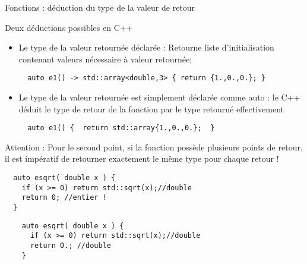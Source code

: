 \documentclass[compress,10pt,aspectratio=169]{beamer}
\begin{document}
\begin{frame}[fragile]{Fonctions : déduction du type de la valeur de retour}
    \scriptsize
    
    Deux déductions possibles en C++
    \begin{itemize}
  \item \textcolor{NavyBlue}{Le type de la valeur retournée déclarée} : Retourne liste d'initialisation contenant valeurs nécessaire à valeur retournée;
  \begin{verbatim}
  auto e1() -> std::array<double,3> { return {1.,0.,0.}; }
  \end{verbatim}
  \item \textcolor{NavyBlue}{Le type de la valeur retournée est simplement déclarée comme auto} : le C++ déduit le type de retour de la fonction par le type retourné
  effectivement
  \begin{verbatim}
  auto e1() {  return std::array{1.,0.,0.};  }
  \end{verbatim}
  \end{itemize}
  
  \alert{Attention} : Pour le second point, si la fonction possède plusieurs points de retour, il est impératif de retourner exactement
  le même type pour chaque retour !
  
  \begin{multicols}{2}
  \begin{tcolorbox}[colback=red!5!white,colframe=red!30!black, title={\scriptsize Ne compile pas !}]
  \begin{verbatim}
  auto esqrt( double x ) {
    if (x >= 0) return std::sqrt(x);//double
    return 0; //entier !
  }
  \end{verbatim}
  \end{tcolorbox}
  \columnbreak
  \begin{tcolorbox}[colback=green!5!white,colframe=green!10!black, title={\scriptsize Compile !}]
  \begin{verbatim}
    auto esqrt( double x ) {
      if (x >= 0) return std::sqrt(x);//double
      return 0.; //double  
    }
    \end{verbatim}
    \end{tcolorbox}
    
  \end{multicols}
  \end{frame}
\end{document}
